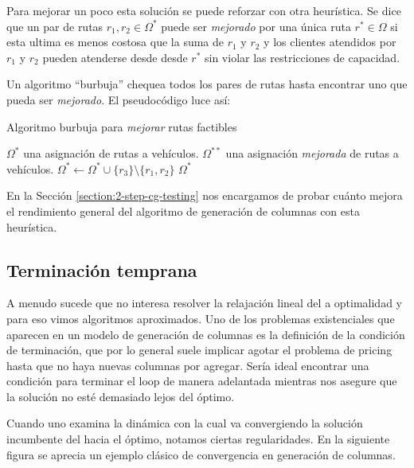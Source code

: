 Para mejorar un poco esta solución se puede reforzar con otra heurística. Se dice que un par de rutas $r_1, r_2 \in \Omega^{*}$ puede ser \emph{mejorado} por una única ruta $r^{*} \in \Omega$ si esta ultima es menos costosa que la suma de $r_1$ y $r_2$ y los clientes atendidos por $r_1$ y $r_2$ pueden atenderse desde desde $r^{*}$ sin violar las restricciones de capacidad.

Un algoritmo ``burbuja'' chequea todos los pares de rutas hasta encontrar uno que pueda ser \emph{mejorado}. El pseudocódigo luce así:

\begin{algorithm}[H]
  \caption{Algoritmo burbuja para \emph{mejorar} rutas factibles}
  \label{al:bubble-algorithm}
  \begin{algorithmic}[1]
  	\Require $\Omega^{*}$ una asignación de rutas a vehículos. 
  	\Ensure $\Omega^{**}$ una asignación \emph{mejorada} de rutas a vehículos. 
            \State $\Omega^{*} \gets \Omega^{*} \cup \{r_3\} \setminus \{r_1, r_2\}$
        \EndWhile
	\Return $\Omega^{*}$
  \end{algorithmic}
\end{algorithm}

En la Sección \ref{section:2-step-cg-testing} nos encargamos de probar cuánto mejora el rendimiento general del algoritmo de generación de columnas con esta heurística.

\subsection{Terminación temprana}
\label{section:finish-early}

A menudo sucede que no interesa resolver la relajación lineal del  a optimalidad y para eso vimos algoritmos aproximados. Uno de los problemas existenciales que aparecen en un modelo de generación de columnas es la definición de la condición de terminación, que por lo general suele implicar agotar el problema de pricing hasta que no haya nuevas columnas por agregar. Sería ideal encontrar una condición para terminar el loop de manera adelantada mientras nos asegure que la solución no esté demasiado lejos del óptimo.

Cuando uno examina la dinámica con la cual va convergiendo la solución incumbente del  hacia el óptimo, notamos ciertas regularidades. En la siguiente figura se aprecia un ejemplo clásico de convergencia en generación de columnas. 

